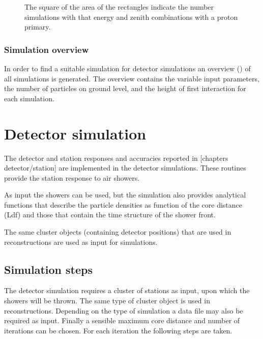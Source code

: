 \begin{figure}
    \centering
    
    \caption{ The square of the
             area of the rectangles indicate the number simulations with
             that energy and zenith combinations with a proton primary.}
    \label{fig:simulations_proton_energy_zenith}
\end{figure}


\subsubsection{Simulation overview}

In order to find a suitable \corsika simulation for detector simulations
an overview (\hdf) of all \corsika simulations is generated. The
overview contains the variable input parameters, the number of particles
on ground level, and the height of first interaction for each
simulation.


\section{Detector simulation}

The detector and station responses and accuracies reported in [chapters
detector/station] are implemented in the detector simulations. These
routines provide the station response to air showers.

As input the \corsika showers can be used, but the simulation also
provides analytical functions that describe the particle densities as
function of the core distance (Ldf) and those that contain the time
structure of the shower front.

The same cluster objects (containing detector positions) that are used
in reconstructions are used as input for simulations.


\subsection{Simulation steps}

The detector simulation requires a cluster of stations as input, upon
which the showers will be thrown. The same type of cluster object is
used in reconstructions. Depending on the type of simulation a \corsika
data file may also be required as input. Finally a sensible maximum core
distance and number of iterations can be chosen. For each iteration the following steps are taken.

